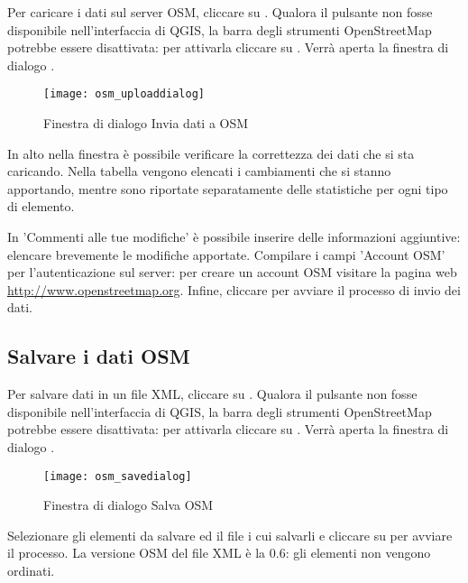 Per caricare i dati sul server OSM, cliccare su . 
Qualora il pulsante non fosse disponibile nell'interfaccia di QGIS, la barra degli strumenti OpenStreetMap 
potrebbe essere disattivata: per attivarla cliccare su  \arrow
{} \arrow {}. Verrà aperta la finestra di dialogo 
.

\begin{figure}[ht]
   \centering
   \texttt{[image: osm\_uploaddialog]}
   \caption{Finestra di dialogo Invia dati a OSM \nixcaption}\label{fig:osmupload}
\end{figure}

In alto nella finestra è possibile verificare la correttezza dei dati che si sta caricando. Nella tabella 
vengono elencati i cambiamenti che si stanno apportando, mentre sono riportate separatamente delle 
statistiche per ogni tipo di elemento.

In 'Commenti alle tue modifiche' è possibile inserire delle informazioni aggiuntive: elencare brevemente 
le modifiche apportate.
Compilare i campi 'Account OSM' per l'autenticazione sul server: per creare un account OSM visitare 
la pagina web \url{http://www.openstreetmap.org}. Infine, cliccare  per avviare il processo 
di invio dei dati.

\subsection{Salvare i dati OSM}

Per salvare dati in un file XML, cliccare su . 
Qualora il pulsante non fosse disponibile nell'interfaccia di QGIS, la barra degli strumenti OpenStreetMap 
potrebbe essere disattivata: per attivarla cliccare su  \arrow
{} \arrow {}. Verrà aperta la finestra di dialogo 
.

\begin{figure}[ht]
   \centering
   \texttt{[image: osm\_savedialog]}
   \caption{Finestra di dialogo Salva OSM \nixcaption}\label{fig:osmsave}
\end{figure}

Selezionare gli elementi da salvare ed il file i cui salvarli e cliccare su  per avviare il 
processo. La versione OSM del file XML è la 0.6: gli elementi non vengono ordinati. 

